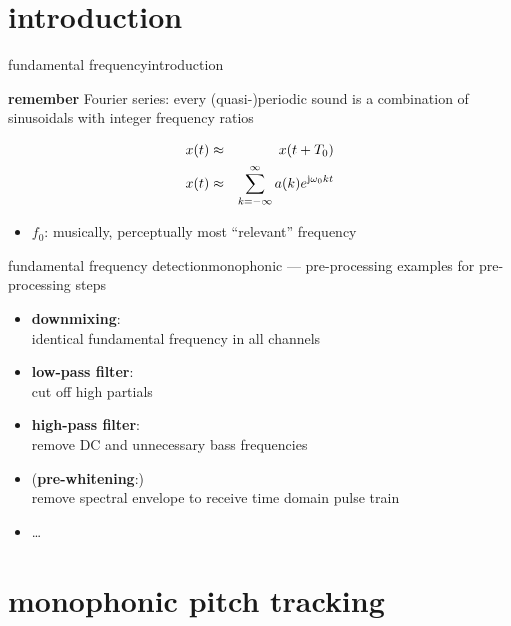     \section[intro]{introduction}
	\begin{frame}{fundamental frequency}{introduction}
        \begin{block}{\textbf{remember}}
            Fourier series: every (quasi-)periodic sound is a combination of sinusoidals with integer frequency ratios
        \end{block}
        \begin{eqnarray*}
            x(t) 	&\approx& x(t+T_0)\nonumber\\
            x(t) &\approx& \sum\limits_{k=-\infty}^{\infty} a(k) {e}^{\mathrm{j}\omega_0kt}\nonumber
        \end{eqnarray*}
        
		\begin{itemize}
			\item<2->[]	$f_0$: musically, perceptually most ``relevant'' frequency
		\end{itemize}
	\end{frame}
	
	\begin{frame}{fundamental frequency detection}{monophonic --- pre-processing}
		examples for pre-processing steps
		\begin{itemize}
			\item	\textbf{downmixing}:\\ identical fundamental frequency in all channels
			\pause
			\item	\textbf{low-pass filter}:\\ cut off high partials
			\pause
			\item	\textbf{high-pass filter}:\\ remove DC and unnecessary bass frequencies
			\pause
			\item	(\textbf{pre-whitening}:)\\ remove spectral envelope to receive time domain pulse train
			\item	\ldots
		\end{itemize}
	\end{frame}
    
    \section[time domain]{monophonic pitch tracking}

